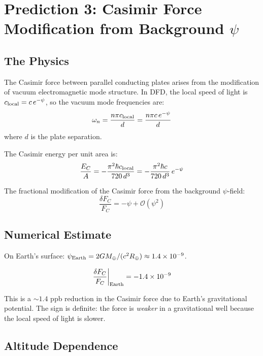 \documentclass[11pt]{article}
\begin{document}
\section{Prediction 3: Casimir Force Modification from Background $\psi$}
\label{sec:casimir}

\subsection{The Physics}

The Casimir force between parallel conducting plates arises from the modification of
vacuum electromagnetic mode structure. In DFD, the local speed of light is
$c_{\rm local} = c\,e^{-\psi}$, so the vacuum mode frequencies are:
\begin{equation}
\omega_n = \frac{n\pi c_{\rm local}}{d} = \frac{n\pi c\,e^{-\psi}}{d}
\end{equation}
where $d$ is the plate separation.

The Casimir energy per unit area is:
\begin{equation}
\frac{E_C}{A} = -\frac{\pi^2 \hbar c_{\rm local}}{720\,d^3}
= -\frac{\pi^2 \hbar c}{720\,d^3}\,e^{-\psi}
\end{equation}

The fractional modification of the Casimir force from the background $\psi$-field:
\begin{equation}
\boxed{\frac{\delta F_C}{F_C} = -\psi + \mathcal{O}(\psi^2)}
\end{equation}

\subsection{Numerical Estimate}

On Earth's surface: $\psi_{\rm Earth} = 2GM_\oplus/(c^2 R_\oplus) \approx 1.4 \times 10^{-9}$.

\begin{equation}
\frac{\delta F_C}{F_C}\bigg|_{\rm Earth} = -1.4 \times 10^{-9}
\end{equation}

This is a $\sim 1.4$ ppb reduction in the Casimir force due to Earth's gravitational
potential. The sign is definite: the force is \emph{weaker} in a gravitational well
because the local speed of light is slower.

\subsection{Altitude Dependence}
\end{document}
